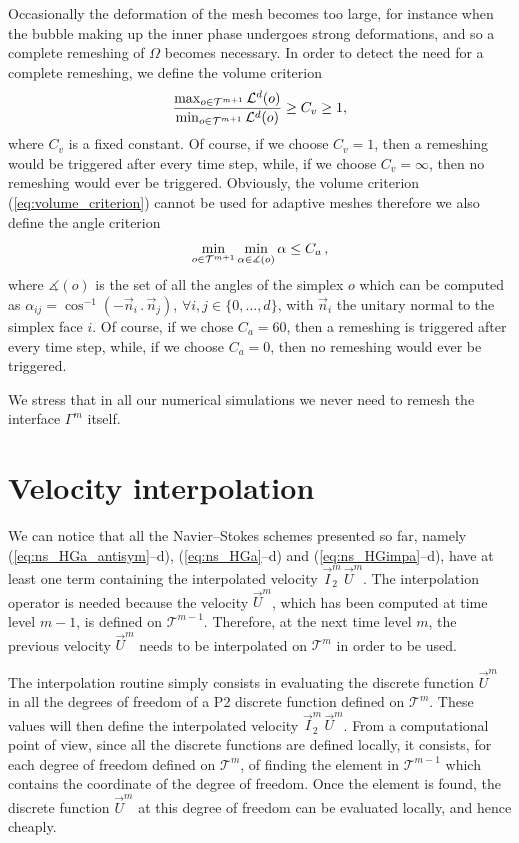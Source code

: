\documentclass[a4paper,12pt,onecolumn]{article}
\newcommand{\vol}{\mathcal{L}^d}
\newcommand{\sigmaO}{o}
\begin{document}
Occasionally the deformation of the mesh becomes too large, for instance when
the bubble making up the inner phase undergoes strong deformations, and so a
complete remeshing of $\Omega$ becomes necessary. In order to detect the need
for a complete remeshing, we define the volume criterion
\begin{equation}\label{eq:volume_criterion}
\frac{\max_{\sigmaO\in {\cal T}^{m+1}}\vol(\sigmaO)}
{\min_{\sigmaO\in\mathcal {T}^{m+1}}\vol(\sigmaO)} \geq C_v \geq 1,
\end{equation}
where $C_v$ is a fixed constant. Of course, if we choose $C_v = 1$, then a
remeshing would be triggered after every time step, while, if we choose $C_v =
\infty$, then no remeshing would ever be triggered. Obviously, the
volume criterion (\ref{eq:volume_criterion}) cannot be used for adaptive
meshes therefore we also define the angle criterion
\begin{equation}\label{eq:angle_criterion}
\min_{\sigmaO\in {\cal T}^{m+1}}\min_{\alpha\in \measuredangle(\sigmaO)}\alpha
\leq C_a\,,
\end{equation}
where $\measuredangle(\sigmaO)$ is the set of all the angles of the simplex
$\sigmaO$ which can be computed as $\alpha_{ij}=\cos^{-1}(-\vec n_i\,.\,\vec
n_j)$, $\forall i,j\in\{0,\dots,d\}$, with $\vec n_i$ the unitary normal to the
simplex face $i$. Of course, if we chose $C_a=60$\textdegree, then a remeshing
is triggered after every time step, while, if we choose
$C_a = 0$\textdegree, then no remeshing would ever be triggered.

We stress that in all our numerical simulations we never need to remesh the
interface $\Gamma^m$ itself.

\section{Velocity interpolation}\label{sec:velocity_interpolation}
We can notice that all the Navier--Stokes schemes presented so far, namely
(\ref{eq:ns_HGa_antisym}--d), (\ref{eq:ns_HGa}--d) and
(\ref{eq:ns_HGimpa}--d), have at least one term containing the
interpolated velocity $\vec I^m_2\,\vec U^m$. The interpolation operator is
needed because the velocity $\vec U^m$, which has been computed at time level
$m-1$, is defined on $\mathcal{T}^{m-1}$. Therefore, at the next time level
$m$, the previous velocity $\vec U^m$ needs to be interpolated on
$\mathcal{T}^m$ in order to be used.

The interpolation routine simply consists in evaluating the discrete function
$\vec U^m$ in all the degrees of freedom of a P2 discrete function defined on
$\mathcal{T}^m$. These values will then define the interpolated velocity
$\vec I^m_2\,\vec U^m$. From a computational point of view, since all the
discrete functions are defined locally, it consists, for each degree of
freedom defined on $\mathcal{T}^m$, of finding the element in
$\mathcal{T}^{m-1}$ which contains the coordinate of the degree of freedom.
Once the element is found, the discrete function $\vec U^m$ at this degree of
freedom can be evaluated locally, and hence cheaply.
\end{document}
